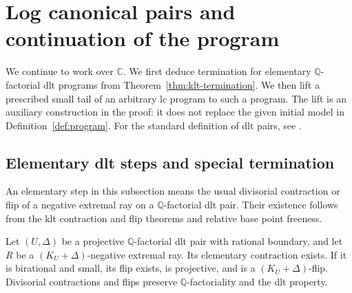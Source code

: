 \section{Log canonical pairs and continuation of the program}\label{sec:lc}

We continue to work over $\mathbb C$.  We first deduce termination for
elementary $\mathbb Q$-factorial dlt programs from
Theorem~\ref{thm:klt-termination}.  We then lift a prescribed small tail of
an arbitrary lc program to such a program.  The lift is an auxiliary
construction in the proof: it does not replace the given initial model
in Definition~\ref{def:program}.
For the standard definition of dlt pairs, see \cite{KM98}.

\subsection{Elementary dlt steps and special termination}

An elementary step in this subsection means the usual divisorial
contraction or flip of a negative extremal ray on a
$\mathbb Q$-factorial dlt pair.  Their existence follows from the klt
contraction and flip theorems and relative base point freeness.

\begin{lemma}\label{lem:dlt-elementary}
Let $(U,\Delta)$ be a projective $\mathbb Q$-factorial dlt pair with rational boundary,
and let $R$ be a $(K_U+\Delta)$-negative extremal ray.  Its elementary
contraction exists.  If it is birational and small, its flip exists,
is projective, and is a $(K_U+\Delta)$-flip.  Divisorial contractions and
flips preserve $\mathbb Q$-factoriality and the dlt property.
\end{lemma}


